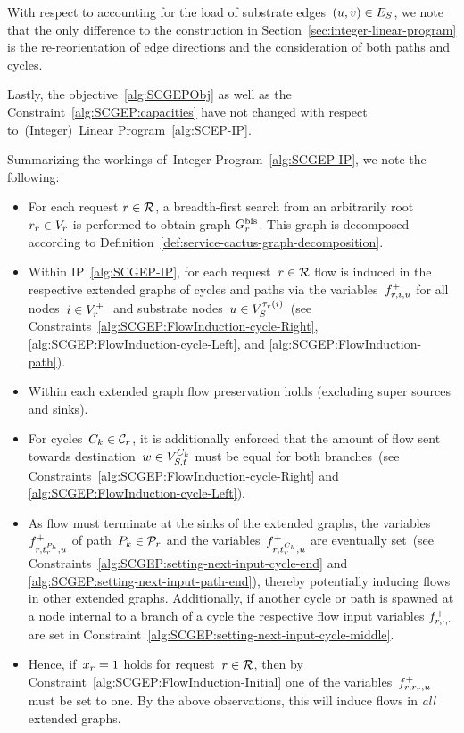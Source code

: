 \documentclass[10pt, conference, letterpaper]{IEEEtran}
\begin{document}
With respect to accounting for the load of substrate edges~$(u,v) \in  \SE$, we note that the only difference to the construction in Section~\ref{sec:integer-linear-program} is the re-reorientation of edge directions and the consideration of both paths and cycles. 

Lastly, the objective~\ref{alg:SCGEPObj} as well as the Constraint~\ref{alg:SCGEP:capacities} have not changed with respect to~(Integer)~Linear Program~\ref{alg:SCEP-IP}.

Summarizing the workings of~Integer Program~\ref{alg:SCGEP-IP}, we note the following:
\begin{itemize}
\item For each request $\req \in \requests$, a breadth-first search from an arbitrarily root $\VVroot \in \VV$ is performed to obtain graph $\VGbfs$. This graph is decomposed according to Definition~\ref{def:service-cactus-graph-decomposition}.
\item Within IP~\ref{alg:SCGEP-IP}, for each request~$\req \in \requests$ flow is induced in the respective extended graphs of cycles and paths via the variables~$\varFlowInput$ for all nodes~$i \in \VVSourcesTargets~$ and substrate nodes~$u \in \SVTypes[\Vtype(i)]$~(see Constraints~\ref{alg:SCGEP:FlowInduction-cycle-Right}, \ref{alg:SCGEP:FlowInduction-cycle-Left}, and \ref{alg:SCGEP:FlowInduction-path}).
\item Within each extended graph flow preservation holds (excluding super sources and sinks).
\item For cycles~$C_k \in \Cycles$, it is additionally enforced that the amount of flow sent towards destination~$w \in  \SVTypesCycle$ must be equal for both branches~(see Constraints~\ref{alg:SCGEP:FlowInduction-cycle-Right} and \ref{alg:SCGEP:FlowInduction-cycle-Left}).
\item As flow must terminate at the sinks of the extended graphs, the variables~$\varFlowInput[\req][\VVpathTarget][u]$ of path~$P_k \in \Paths$ and the variables~$\varFlowInput[\req][\VVcycleTarget][u]$ are eventually set~(see Constraints~\ref{alg:SCGEP:setting-next-input-cycle-end} and \ref{alg:SCGEP:setting-next-input-path-end}), thereby potentially inducing flows in other extended graphs. Additionally, if another cycle or path is spawned at a node internal to a branch of a cycle the respective flow input variables $f^+_{\req,\cdot,\cdot}$ are set in  Constraint~\ref{alg:SCGEP:setting-next-input-cycle-middle}.
\item Hence, if~$x_\req=1$ holds for request~$\req \in \requests$, then by Constraint~\ref{alg:SCGEP:FlowInduction-Initial} one of the variables~$\varFlowInput[\req][\VVroot][u]$ must be set to one. By the above observations, this will induce flows in \emph{all} extended graphs. 
\end{itemize}
\end{document}
